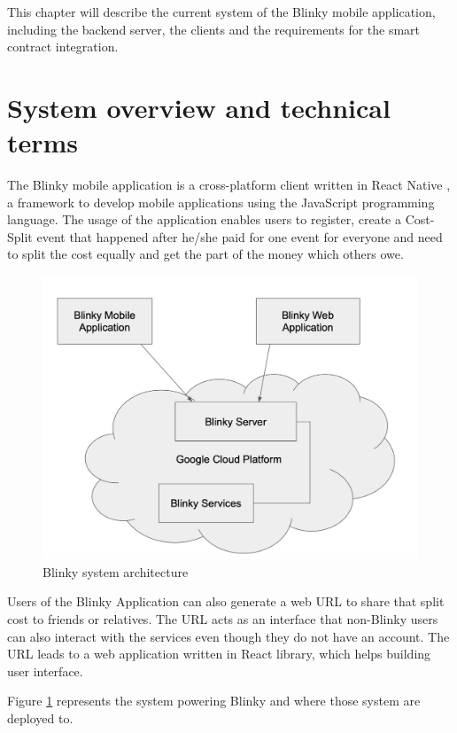 \documentclass[twoside,draftfooter]{tutthesis} %
\begin{document}
This chapter will describe the current system of the Blinky mobile application, including the backend server, the clients  and the requirements for the smart contract integration.

\section{System overview and technical terms}

The Blinky mobile application is a cross-platform client written in React Native \citep{ReactNative}, a framework to develop mobile applications using the JavaScript programming language. The usage of the application enables users to register, create a Cost-Split event that happened after he/she paid for one event for everyone and need to split the cost equally and get the part of the money which others owe.

\begin{figure}
    \centering
    \includegraphics[width=\linewidth]{blinky_system_architecture.jpg}
    \caption{Blinky system architecture}
    \label{fig:blinky_system}
\end{figure}

Users of the Blinky Application can also generate a web URL to share that split cost to friends or relatives. The URL acts as an interface that non-Blinky users can also interact with the services even though they do not have an account. The URL leads to a web application written in React library, which helps building user interface.

Figure \ref{fig:blinky_system} represents the system powering Blinky and where those system are deployed to. 
\end{document}
